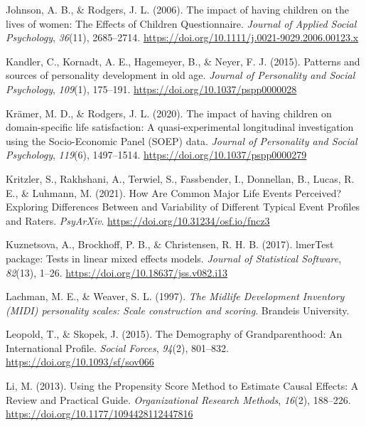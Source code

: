 \documentclass[
  english,
  man, noextraspace]{apa7}
\begin{document}
\leavevmode\hypertarget{ref-johnsonImpactHavingChildren2006}{}%
Johnson, A. B., \& Rodgers, J. L. (2006). The impact of having children on the lives of women: The Effects of Children Questionnaire. \emph{Journal of Applied Social Psychology}, \emph{36}(11), 2685--2714. \url{https://doi.org/10.1111/j.0021-9029.2006.00123.x}

\leavevmode\hypertarget{ref-kandlerPatternsSourcesPersonality2015a}{}%
Kandler, C., Kornadt, A. E., Hagemeyer, B., \& Neyer, F. J. (2015). Patterns and sources of personality development in old age. \emph{Journal of Personality and Social Psychology}, \emph{109}(1), 175--191. \url{https://doi.org/10.1037/pspp0000028}

\leavevmode\hypertarget{ref-kramerImpactHavingChildren2020}{}%
Krämer, M. D., \& Rodgers, J. L. (2020). The impact of having children on domain-specific life satisfaction: A quasi-experimental longitudinal investigation using the Socio-Economic Panel (SOEP) data. \emph{Journal of Personality and Social Psychology}, \emph{119}(6), 1497--1514. \url{https://doi.org/10.1037/pspp0000279}

\leavevmode\hypertarget{ref-kritzlerHowAreCommon2021}{}%
Kritzler, S., Rakhshani, A., Terwiel, S., Fassbender, I., Donnellan, B., Lucas, R. E., \& Luhmann, M. (2021). How Are Common Major Life Events Perceived? Exploring Differences Between and Variability of Different Typical Event Profiles and Raters. \emph{PsyArXiv}. \url{https://doi.org/10.31234/osf.io/fncz3}

\leavevmode\hypertarget{ref-R-lmerTest}{}%
Kuznetsova, A., Brockhoff, P. B., \& Christensen, R. H. B. (2017). lmerTest package: Tests in linear mixed effects models. \emph{Journal of Statistical Software}, \emph{82}(13), 1--26. \url{https://doi.org/10.18637/jss.v082.i13}

\leavevmode\hypertarget{ref-lachmanMidlifeDevelopmentInventory1997}{}%
Lachman, M. E., \& Weaver, S. L. (1997). \emph{The Midlife Development Inventory (MIDI) personality scales: Scale construction and scoring}. Brandeis University.

\leavevmode\hypertarget{ref-leopoldDemographyGrandparenthoodInternational2015}{}%
Leopold, T., \& Skopek, J. (2015). The Demography of Grandparenthood: An International Profile. \emph{Social Forces}, \emph{94}(2), 801--832. \url{https://doi.org/10.1093/sf/sov066}

\leavevmode\hypertarget{ref-liUsingPropensityScore2013}{}%
Li, M. (2013). Using the Propensity Score Method to Estimate Causal Effects: A Review and Practical Guide. \emph{Organizational Research Methods}, \emph{16}(2), 188--226. \url{https://doi.org/10.1177/1094428112447816}
\end{document}
